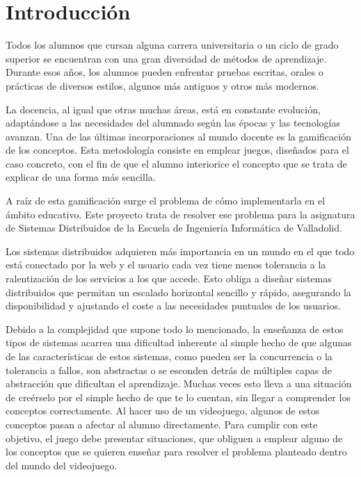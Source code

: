 \chapter{Introducción}\label{Cap1}

Todos los alumnos que cursan alguna carrera universitaria o un ciclo de grado superior se encuentran con una gran diversidad de métodos de aprendizaje. Durante esos años, los alumnos pueden enfrentar pruebas escritas, orales o prácticas de diversos estilos, algunos más antiguos y otros más modernos.

La docencia, al igual que otras muchas áreas, está en constante evolución, adaptándose a las necesidades del alumnado según las épocas y las tecnologías avanzan. Una de las últimas incorporaciones al mundo docente es la gamificación de los conceptos. Esta metodología consiste en emplear juegos, diseñados para el caso concreto, con el fin de que el alumno interiorice el concepto que se trata de explicar de una forma más sencilla.

A raíz de esta gamificación surge el problema de cómo implementarla en el ámbito educativo. Este proyecto trata de resolver ese problema para la asignatura de Sistemas Distribuidos de la Escuela de Ingeniería Informática de Valladolid.

Los sistemas distribuidos adquieren más importancia en un mundo en el que todo está conectado por la web y el usuario cada vez tiene menos tolerancia a la ralentización de los servicios a los que accede. Esto obliga a diseñar sistemas distribuidos que permitan un escalado horizontal sencillo y rápido, asegurando la disponibilidad y ajustando el coste a las necesidades puntuales de los usuarios.

Debido a la complejidad que supone todo lo mencionado, la enseñanza de estos tipos de sistemas acarrea una dificultad inherente al simple hecho de que algunas de las características de estos sistemas, como pueden ser la concurrencia o la tolerancia a fallos, son abstractas o se esconden detrás de múltiples capas de abstracción que dificultan el aprendizaje. Muchas veces esto lleva a una situación de creérselo por el simple hecho de que te lo cuentan, sin llegar a comprender los conceptos correctamente. Al hacer uso de un videojuego, algunos de estos conceptos pasan a afectar al alumno directamente. Para cumplir con este objetivo, el juego debe presentar situaciones, que obliguen a emplear alguno de los conceptos que se quieren enseñar para resolver el problema planteado dentro del mundo del videojuego.

